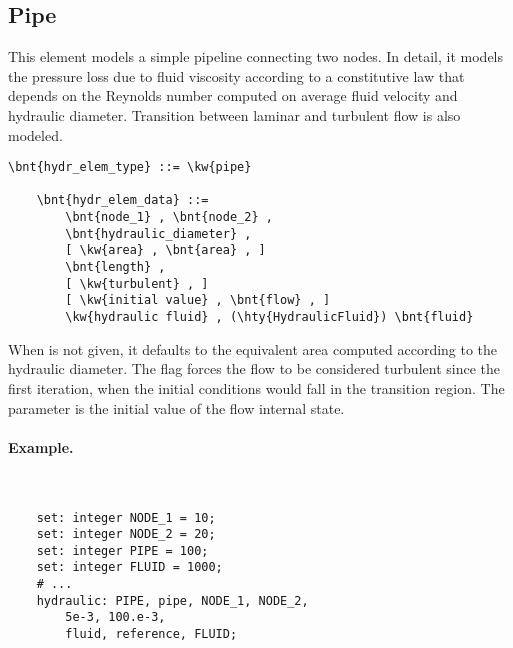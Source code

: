 \subsection{Pipe}
\label{sec:EL:HYDR:PIPE}
This element models a simple pipeline connecting two  nodes.
In detail, it models the pressure loss due to fluid viscosity
according to a constitutive law that depends on the Reynolds number
computed on average fluid velocity and hydraulic diameter.
Transition between laminar and turbulent flow is also modeled.
\begin{Verbatim}[commandchars=\\\{\}]
    \bnt{hydr_elem_type} ::= \kw{pipe}

    \bnt{hydr_elem_data} ::=
        \bnt{node_1} , \bnt{node_2} ,
        \bnt{hydraulic_diameter} ,
        [ \kw{area} , \bnt{area} , ]
        \bnt{length} ,
        [ \kw{turbulent} , ]
        [ \kw{initial value} , \bnt{flow} , ]
        \kw{hydraulic fluid} , (\hty{HydraulicFluid}) \bnt{fluid}
\end{Verbatim}
When  is not given, it defaults to the equivalent area
computed according to the hydraulic diameter.
The flag  forces the flow to be considered turbulent
since the first iteration, when the initial conditions would fall
in the transition region.
The  parameter is the initial value
of the flow internal state.

\paragraph{Example.} \
\begin{verbatim}
    set: integer NODE_1 = 10;
    set: integer NODE_2 = 20;
    set: integer PIPE = 100;
    set: integer FLUID = 1000;
    # ...
    hydraulic: PIPE, pipe, NODE_1, NODE_2,
        5e-3, 100.e-3,
        fluid, reference, FLUID;
\end{verbatim}



